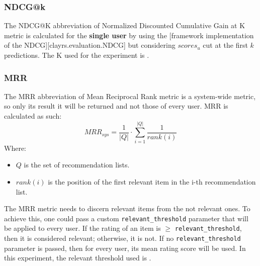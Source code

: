 \documentclass[11pt]{article}
\begin{document}
\subsubsection{NDCG@k}\label{subsubsec:ndcg-k}
The NDCG@K abbreviation of Normalized Discounted Cumulative Gain at K metric is calculated for the \textbf{single user}
by using the [framework implementation of the NDCG][clayrs.evaluation.NDCG] but considering $scores_{u}$ cut at the
first $k$ predictions.
The K used for the experiment is .
\hfill\break
\hfill\break

\subsubsection{MRR}\label{subsubsec:mrr}
The MRR abbreviation of Mean Reciprocal Rank metric is a system-wide metric, so only its result it will be returned
and not those of every user.
MRR is calculated as such:
\hfill\break
\hfill\break
    \[
        MRR_{sys} = \frac{1}{|Q|}\cdot\sum_{i=1}^{|Q|}\frac{1}{rank(i)}
    \]
\hfill\break
\hfill\break
    Where:
\begin{itemize}
    \item $Q$ is the set of recommendation lists.
    \item $rank(i)$ is the position of the first relevant item in the i-th recommendation list.
\end{itemize}
\hfill\break
\hfill\break
The MRR metric needs to discern relevant items from the not relevant ones.
To achieve this, one could pass a custom \texttt{relevant\_threshold} parameter that will be applied to every user.
If the rating of an item is $\geq$ \texttt{relevant\_threshold}, then it is considered relevant; otherwise, it is not.
If no \texttt{relevant\_threshold} parameter is passed, then for every user, its mean rating score will be used.
In this experiment, the relevant threshold used is
.
\hfill\break
\hfill\break

\end{document}
